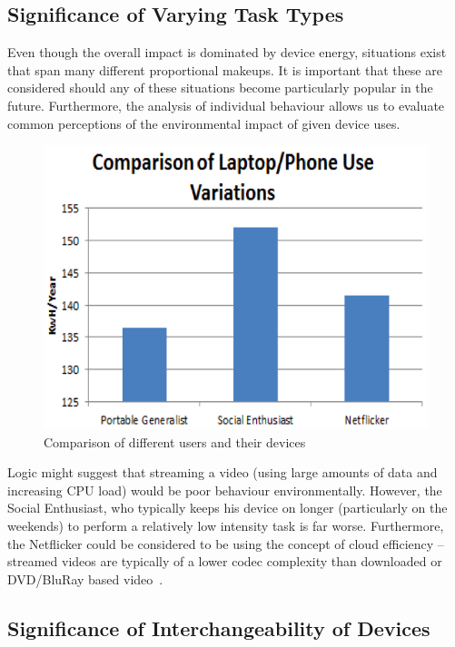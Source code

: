 \documentclass[conference]{IEEEtran}
\begin{document}
\subsection{Significance of Varying Task Types}

Even though the overall impact is dominated by device energy,
situations exist that span many different proportional makeups. It is
important that these are considered should any of these situations
become particularly popular in the future. Furthermore, the analysis
of individual behaviour allows us to evaluate common perceptions of
the environmental impact of given device uses.

\begin{figure}[!ht]
\centering
\includegraphics[width=0.9\columnwidth]{images/comparison_users_devices.png}
\caption{Comparison of different users and their devices}
\label{fig:comparison_users_devices.png} 
\end{figure}

Logic might suggest that streaming a video (using large amounts of
data and increasing CPU load) would be poor behaviour
environmentally. However, the Social Enthusiast, who typically keeps
his device on longer (particularly on the weekends) to perform a
relatively low intensity task is far worse. Furthermore, the
Netflicker could be considered to be using the concept of cloud
efficiency -- streamed videos are typically of a lower codec
complexity than downloaded or DVD/BluRay based
video~\cite{schien-et-al:2013}.

\subsection{Significance of Interchangeability of Devices}
\end{document}
